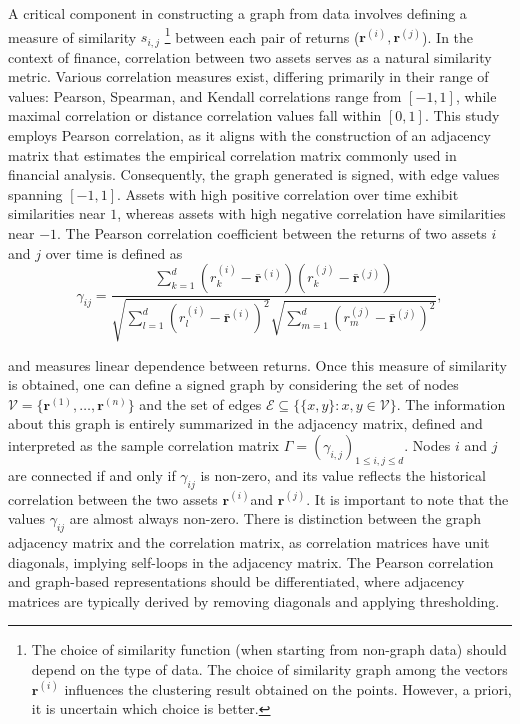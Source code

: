\documentclass[sigconf]{acmart}
\begin{document}
A critical component in constructing a graph from data involves defining a measure of similarity \(s_{i,j}\) \footnote{The choice of similarity function (when starting from non-graph data) should depend on the type of data. The choice of similarity graph among the vectors $\mathbf{r}^{(i)}$ influences the clustering result obtained on the points. However, a priori, it is uncertain which choice is better.} between each pair of returns (\(\mathbf{r}^{(i)}, \mathbf{r}^{(j)}\)). In the context of finance, correlation between two assets serves as a natural similarity metric. Various correlation measures exist, differing primarily in their range of values: Pearson, Spearman, and Kendall correlations range from $[-1, 1]$, while maximal correlation or distance correlation values fall within $[0, 1]$. This study employs Pearson correlation, as it aligns with the construction of an adjacency matrix that estimates the empirical correlation matrix commonly used in financial analysis. Consequently, the graph generated is signed, with edge values spanning $[-1, 1]$. Assets with high positive correlation over time exhibit similarities near $1$, whereas assets with high negative correlation have similarities near $-1$. The Pearson correlation coefficient between the returns of two assets $i$ and $j$ over time is defined as
$$
    \gamma_{ij} =\frac{\sum ^d _{k=1}(r^{(i)}_k - \bar{\mathbf{r}}^{(i)})(r^{(j)}_k - \bar{\mathbf{r}}^{(j)})}{\sqrt{\sum ^d _{l=1}(r^{(i)}_l - \bar{\mathbf{r}}^{(i)})^2} \sqrt{\sum ^d _{m=1}(r^{(j)}_m - \bar{\mathbf{r}}^{(j)})^2}}, 
$$ 

\noindent  
and measures linear dependence between returns. Once this measure of similarity is obtained, one can define a signed graph by considering the set of nodes \(\mathcal{V} = \{\mathbf{r}^{(1)}, \ldots, \mathbf{r}^{(n)}\}\) and the set of edges $\mathcal{E} \subseteq \{\{x, y\}:x, y \in \mathcal{V}\}$. The information about this graph is entirely summarized in the adjacency matrix, defined and interpreted as the sample correlation matrix $\Gamma = (\gamma_{i,j})_{1 \leq i, j \leq d}$. Nodes $i$ and $j$ are connected if and only if $\gamma_{ij}$ is non-zero, and its value reflects the historical correlation between the two assets $\mathbf{r}^{(i)}$and $\mathbf{r}^{(j)}$. It is important to note that the values $\gamma_{ij}$ are almost always non-zero. There is distinction between the graph adjacency matrix and the correlation matrix, as correlation matrices have unit diagonals, implying self-loops in the adjacency matrix. The Pearson correlation and graph-based representations should be differentiated, where adjacency matrices are typically derived by removing diagonals and applying thresholding.
\end{document}
